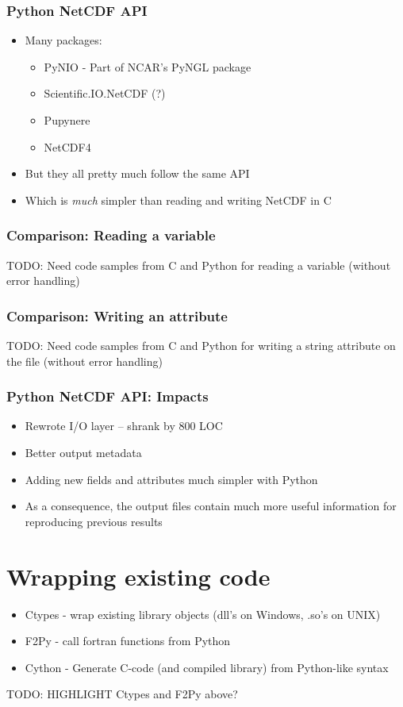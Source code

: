 \documentclass[red, hyperref={pdfpagelabels=false}]{beamer}
\begin{document}
\begin{frame}
  \frametitle{Python NetCDF API}
  \begin{itemize}
    \item Many packages:
    \begin{itemize}
      \item PyNIO - Part of NCAR's PyNGL package
      \item Scientific.IO.NetCDF (?)
      \item Pupynere
      \item NetCDF4
    \end{itemize}
    \item But they all pretty much follow the same API
    \item Which is \emph{much} simpler than reading and writing NetCDF in C
  \end{itemize}
\end{frame}

\begin{frame}
  \frametitle{Comparison: Reading a variable}
  TODO: Need code samples from C and Python for reading a variable (without error handling)
\end{frame}

\begin{frame}
  \frametitle{Comparison: Writing an attribute}
  TODO: Need code samples from C and Python for writing a string attribute on the file (without error handling)
\end{frame}

\begin{frame}
  \frametitle{Python NetCDF API: Impacts}
  \begin{itemize}
    \item Rewrote I/O layer -- shrank by 800 LOC
    \item Better output metadata
    \item Adding new fields and attributes much simpler with Python
    \item As a consequence, the output files contain much more useful
      information for reproducing previous results
  \end{itemize}
\end{frame}

\section{Wrapping existing code}

\begin{frame}
  \begin{itemize}
    \item Ctypes - wrap existing library objects (dll's on Windows, .so's on UNIX)
    \item F2Py - call fortran functions from Python
    \item Cython - Generate C-code (and compiled library) from Python-like syntax
  \end{itemize}
  TODO: HIGHLIGHT Ctypes and F2Py above?
\end{frame}
\end{document}
